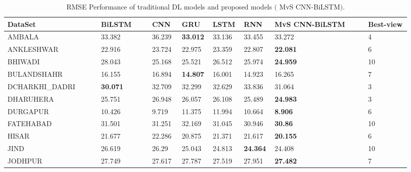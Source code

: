 \begin{landscape}
    \setlength{\tabcolsep}{3pt}
  
    {\renewcommand{\arraystretch}{1}%
    \begin{longtable}[h!]{ p{0.22\linewidth} p{0.12\linewidth} p{0.07\linewidth} p{0.07\linewidth}  p{0.07\linewidth} p{0.07\linewidth} p{0.22\linewidth}  p{0.1\linewidth}}%
        \caption{RMSE Performance of traditional DL models and proposed models $($ MvS CNN-BiLSTM$)$.}
        \label{tab: RMSE}\\
    \hline  DataSet        & BiLSTM  & CNN & GRU      & LSTM & RNN       & MvS CNN-BiLSTM        & Best-view \\ \hline
    \endhead
    \hline
    \endfoot
    \endlastfoot
    AMBALA         & 33.382          & 36.239    & \textbf{33.012} & 33.136     & 33.455                & 33.272          & 4      \\
    ANKLESHWAR     & 22.916          & 23.724    & 22.975          & 23.359     & 22.807                & \textbf{22.081} & 6      \\
    BHIWADI        & 28.043          & 25.168    & 25.521          & 26.512     & 25.974                & \textbf{24.959} & 10     \\
    BULANDSHAHR    & 16.155          & 16.894    & \textbf{14.807} & 16.001     & 14.923                & 16.265          & 7      \\
     DCHARKHI\_DADRI & \textbf{30.071} & 32.709    & 32.299          & 32.629     & 33.836              & 31.064          & 3      \\
     DHARUHERA      & 25.751          & 26.948    & 26.057          & 26.108     & 25.489           &\textbf{24.983}          & 3      \\
     DURGAPUR       & 10.426          & 9.719     & 11.375          & 11.994     & 10.664                    & \textbf{8.906}  & 6      \\
     FATEHABAD      & 31.501          & 31.251    & 32.169          & 31.045     & 30.946                    & \textbf{30.86}  & 10     \\
     HISAR          & 21.677          & 22.286    & 20.875          & 21.371     & 21.617                 & \textbf{20.155} & 6      \\
     JIND           & 26.619          & 26.29     & 25.043          & 24.813     & \textbf{24.364}           & 24.408          & 10     \\
     JODHPUR        & 27.749          & 27.617    & 27.787          & 27.519     & 27.951              & \textbf{27.482} & 7      \\

\end{longtable}}
\end{landscape}

